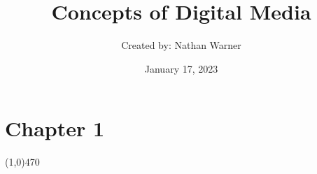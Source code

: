 \documentclass{report}
\title{\Huge{Concepts of Digital Media}}
\author{\huge{Created by: Nathan Warner}}
\date{\huge{January 17, 2023}}
\begin{document}
    \maketitle
    \section{\Large{Chapter 1}}
    \line(1,0){470}
\end{document}
